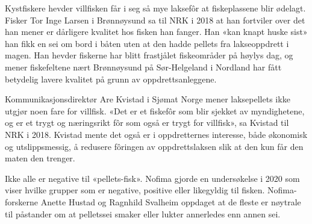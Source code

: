 Kystfiskere hevder villfisken får i seg så mye laksefôr at fiskeplassene blir ødelagt. Fisker Tor Inge Larsen i Brønnøysund sa til NRK i 2018 at han fortviler over det han mener er dårligere kvalitet hos fisken han fanger. Han «kan knapt huske sist» han fikk en sei om bord i båten uten at den hadde pellets fra lakseoppdrett i magen. Han hevder fiskerne har blitt frastjålet fiskeområder på høylys dag, og mener fiskefeltene nært Brønnøysund på Sør-Helgeland i Nordland har fått betydelig lavere kvalitet på grunn av oppdrettsanleggene. \cite{Olsen m.fl. 2018}

Kommunikasjonsdirektør Are Kvistad i Sjømat Norge mener laksepellets ikke utgjør noen fare for villfisk. «Det er et fiskefôr som blir sjekket av myndighetene, og er et trygt og næringsrikt fôr som også er trygt for villfisk», sa Kvistad til NRK i 2018. Kvistad mente det også er i oppdretternes interesse, både økonomisk og utslippsmessig, å redusere fôringen av oppdrettslaksen slik at den kun får den maten den trenger. \cite{Olsen m.fl. 2018}


Ikke alle er negative til «pellets-fisk». Nofima gjorde en undersøkelse i 2020 som viser hvilke grupper som er negative, positive eller likegyldig til fisken. Nofima-forskerne Anette Hustad og Ragnhild Svalheim oppdaget at de fleste er nøytrale til påstander om at pelletssei smaker eller lukter annerledes enn annen sei. \cite{Hustad og Svalheim 2020}

